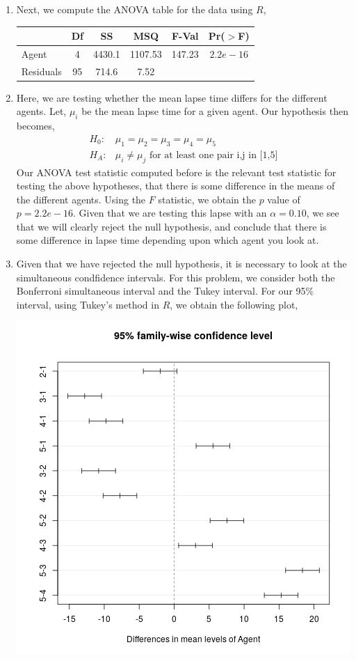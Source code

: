 \documentclass[letterpaper,10pt]{article}
\begin{document}
\begin{enumerate}
\begin{enumerate}
\item Next, we compute the ANOVA table for the data using $R$,
\begin{center}
\begin{tabular}{|l|c|c|c|c|c|}
\hline
& Df & SS & MSQ & F-Val & Pr($>$F)\\\hline
Agent & 4 & 4430.1 & 1107.53 & 147.23 & $2.2e-16$\\\hline
Residuals & 95 & 714.6 & 7.52 &&\\\hline
\end{tabular}
\end{center}
\item Here, we are testing whether the mean lapse time differs for the different agents. Let, $\mu_i$ be the mean lapse time for a given agent. Our hypothesis then becomes,
\begin{align*}
H_0: & \mu_1=\mu_2=\mu_3=\mu_4=\mu_5\\
H_A: & \mu_i\neq \mu_j \text{ for at least one pair i,j in [1,5]}
\end{align*}
Our ANOVA test statistic computed before is the relevant test statistic for testing the above hypotheses, that there is some difference in the means of the different agents. Using the $F$ statistic, we obtain the $p$ value of $p=2.2e-16$. Given that we are testing this lapse with an $\alpha=0.10$, we see that we will clearly reject the null hypothesis, and conclude that there is some difference in lapse time depending upon which agent you look at.
\item Given that we have rejected the null hypothesis, it is necessary to look at the simultaneous condfidence intervals. For this problem, we consider both the Bonferroni simultaneous interval and the Tukey interval. For our 95\% interval, using Tukey's method in $R$, we obtain the following plot,
\begin{center}
\includegraphics[scale=.65]{3tukey.png}

\end{center}
\end{enumerate}
\end{enumerate}
\end{document}
